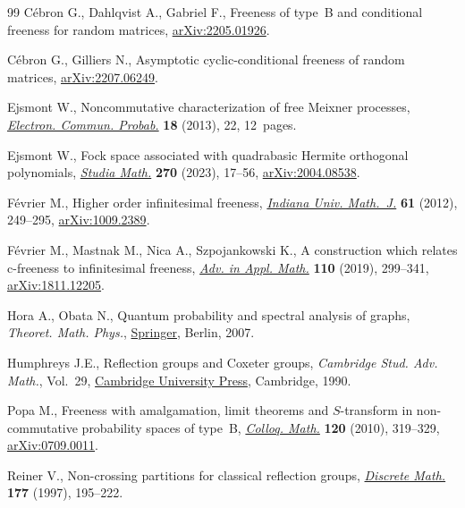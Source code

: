 \documentclass[pdftex]{sigma}
\numberwithin{equation}{section}
\begin{document}
\begin{thebibliography}{99}
C\'ebron G., Dahlqvist A., Gabriel F., Freeness of type~{B} and conditional
 freeness for random matrices, \href{https://arxiv.org/abs/2205.01926}{arXiv:2205.01926}.

C\'ebron G., Gilliers N., Asymptotic cyclic-conditional freeness of random
 matrices, \href{https://arxiv.org/abs/2207.06249}{arXiv:2207.06249}.

Ejsmont W., Noncommutative characterization of free {M}eixner processes,
 \href{https://doi.org/10.1214/ECP.v18-2356}{\textit{Electron. Commun. Probab.}} \textbf{18} (2013), 22, 12~pages.

Ejsmont W., Fock space associated with quadrabasic {H}ermite orthogonal
 polynomials, \href{https://doi.org/10.4064/sm210916-19-8}{\textit{Studia Math.}} \textbf{270} (2023), 17--56,
 \href{https://arxiv.org/abs/2004.08538}{arXiv:2004.08538}.

F\'evrier M., Higher order infinitesimal freeness, \href{https://doi.org/10.1512/iumj.2012.61.4497}{\textit{Indiana Univ.
 Math.~J.}} \textbf{61} (2012), 249--295, \href{https://arxiv.org/abs/1009.2389}{arXiv:1009.2389}.

F\'evrier M., Mastnak M., Nica A., Szpojankowski K., A construction which
 relates c-freeness to infinitesimal freeness, \href{https://doi.org/10.1016/j.aam.2019.06.002}{\textit{Adv. in Appl. Math.}}
 \textbf{110} (2019), 299--341, \href{https://arxiv.org/abs/1811.12205}{arXiv:1811.12205}.

Hora A., Obata N., Quantum probability and spectral analysis of graphs,
 \textit{Theoret. Math. Phys.}, \href{https://doi.org/10.1007/3-540-48863-4}{Springer}, Berlin, 2007.

Humphreys J.E., Reflection groups and {C}oxeter groups, \textit{Cambridge Stud.
 Adv. Math.}, Vol.~29, \href{https://doi.org/10.1017/CBO9780511623646}{Cambridge University Press}, Cambridge, 1990.

Popa M., Freeness with amalgamation, limit theorems and {$S$}-transform in
 non-commutative probability spaces of type~{B}, \href{https://doi.org/10.4064/cm120-2-11}{\textit{Colloq. Math.}}
 \textbf{120} (2010), 319--329, \href{https://arxiv.org/abs/0709.0011}{arXiv:0709.0011}.

Reiner V., Non-crossing partitions for classical reflection groups,
 \href{https://doi.org/10.1016/S0012-365X(96)00365-2}{\textit{Discrete Math.}} \textbf{177} (1997), 195--222.


\end{thebibliography}
\end{document}
